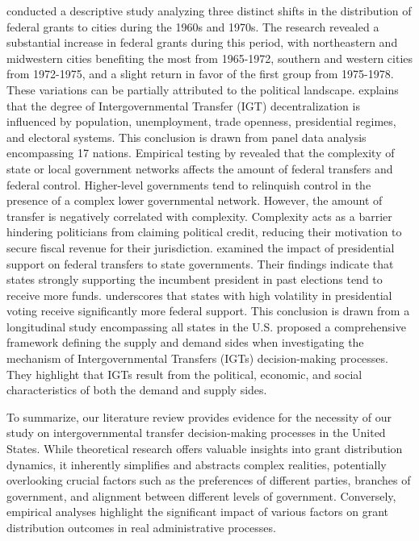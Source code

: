 \textcite{markusen1981benefits} conducted a descriptive study analyzing three distinct shifts in the distribution of federal grants to cities during the 1960s and 1970s. The research revealed a substantial increase in federal grants during this period, with northeastern and midwestern cities benefiting the most from 1965-1972, southern and western cities from 1972-1975, and a slight return in favor of the first group from 1975-1978. These variations can be partially attributed to the political landscape. \textcite{stegarescu2006decentralised} explains that the degree of Intergovernmental Transfer (IGT) decentralization is influenced by population, unemployment, trade openness, presidential regimes, and electoral systems. This conclusion is drawn from panel data analysis encompassing 17 nations. Empirical testing by \textcite{kasdin2016decision} revealed that the complexity of state or local government networks affects the amount of federal transfers and federal control. Higher-level governments tend to relinquish control in the presence of a complex lower governmental network. However, the amount of transfer is negatively correlated with complexity. Complexity acts as a barrier hindering politicians from claiming political credit, reducing their motivation to secure fiscal revenue for their jurisdiction. \textcite{larcinese2006allocating} examined the impact of presidential support on federal transfers to state governments. Their findings indicate that states strongly supporting the incumbent president in past elections tend to receive more funds. \textcite{wallis1987employment} underscores that states with high volatility in presidential voting receive significantly more federal support. This conclusion is drawn from a longitudinal study encompassing all states in the U.S. \textcite{markusen1981benefits} proposed a comprehensive framework defining the supply and demand sides when investigating the mechanism of Intergovernmental Transfers (IGTs) decision-making processes. They highlight that IGTs result from the political, economic, and social characteristics of both the demand and supply sides.


To summarize, our literature review provides evidence for the necessity of our study on intergovernmental transfer decision-making processes in the United States. While theoretical research offers valuable insights into grant distribution dynamics, it inherently simplifies and abstracts complex realities, potentially overlooking crucial factors such as the preferences of different parties, branches of government, and alignment between different levels of government. Conversely, empirical analyses highlight the significant impact of various factors on grant distribution outcomes in real administrative processes.

